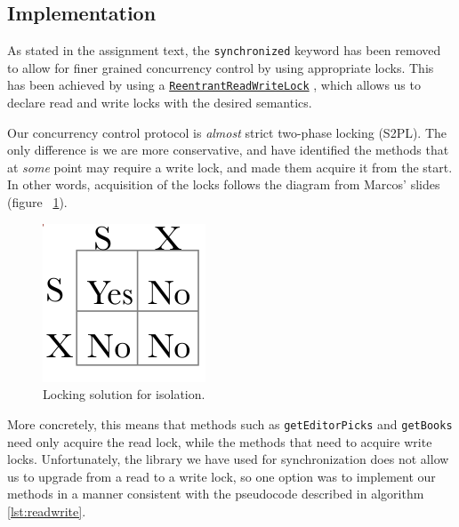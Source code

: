 \documentclass[11pt]{article}
\begin{document}
\subsection*{Implementation}

As stated in the assignment text, the \texttt{synchronized} keyword has
been removed to allow for finer grained concurrency control by using
appropriate locks.
This has been achieved by using a \href{http://docs.oracle.com/javase/6/docs/api/java/util/concurrent/locks/ReentrantReadWriteLock.html}{\texttt{ReentrantReadWriteLock}}  ,
which allows us to declare read and write locks with the desired semantics.

Our concurrency control protocol is \emph{almost} strict two-phase locking (S2PL).
The only difference is we are more conservative, and have identified the methods
that at \emph{some} point may require a write lock, and made them acquire it
from the start.
In other words, acquisition of the locks follows the diagram from Marcos'
slides (figure ~\ref{fig:lock}).\\

\begin{figure}[h!]
\begin{center}
\includegraphics[scale=0.45]{lock.png}
\caption{Locking solution for isolation.}
\label{fig:lock}
\end{center}
\end{figure}

More concretely, this means that methods such as \texttt{getEditorPicks} and
\texttt{getBooks} need only acquire the read lock, while the methods that
need to acquire write locks. Unfortunately, the library
we have used for synchronization does not allow us to upgrade from a read
to a write lock, so one option was to implement our methods in a manner
consistent with the pseudocode described in algorithm
\ref{lst:readwrite}.\\
\end{document}

